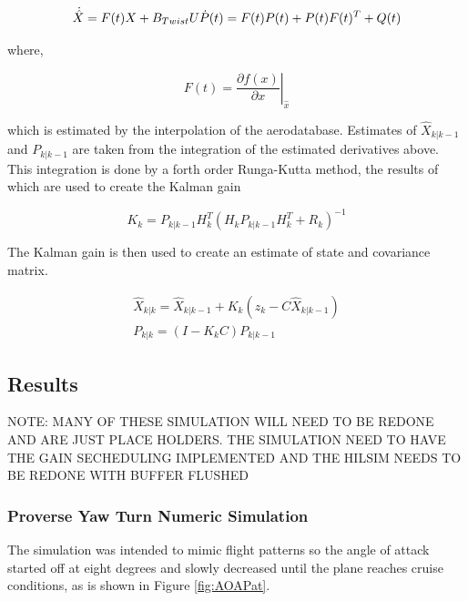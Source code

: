 \documentclass[11pt]{ucthesis}
\begin{document}
\begin{equation}
\dot{\hat{X}} = F(t)X+B_{Twist}U\\
\dot{P}(t) = F(t)P(t)+P(t)F(t)^T+Q(t)
\end{equation}

where,

\begin{equation}
F(t) = \left.\frac{\partial f(x)}{\partial x}\right\vert_{\hat{x}}
\end{equation}

which is estimated by the interpolation of the aerodatabase. Estimates of $\hat{X}_{k\vert k-1}$ and $P_{k\vert k-1}$ are taken from the integration of the estimated derivatives above. This integration is done by a forth order Runga-Kutta method, the results of which are used to create the Kalman gain

\begin{equation}
K_k = P_{k\vert k-1}H_k^T(H_kP_{k\vert k-1}H_k^T+R_k)^{-1}
\end{equation}

The Kalman gain is then used to create an estimate of state and covariance matrix.

\begin{equation}
\begin{matrix}
\hat{X}_{k\vert k} = \hat{X}_{k\vert k-1} + K_k(z_k-C\hat{X}_{k\vert k-1} )\\
P_{k\vert k} = (I-K_kC)P_{k\vert k-1}
\end{matrix}
\end{equation}

\subsection{Results}
{\color{red} NOTE: MANY OF THESE SIMULATION WILL NEED TO BE REDONE AND ARE JUST PLACE HOLDERS. THE SIMULATION NEED TO HAVE THE GAIN SECHEDULING IMPLEMENTED AND THE HILSIM NEEDS TO BE REDONE WITH BUFFER FLUSHED}

\subsubsection{Proverse Yaw Turn Numeric Simulation}
The simulation was intended to mimic flight patterns so the angle of attack started off at eight degrees and slowly decreased until the plane reaches cruise conditions, as is shown in Figure \ref{fig:AOAPat}.
\end{document}
